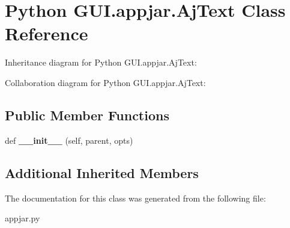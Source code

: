\hypertarget{class_python_01_g_u_i_1_1appjar_1_1_aj_text}{}\section{Python G\+U\+I.\+appjar.\+Aj\+Text Class Reference}
\label{class_python_01_g_u_i_1_1appjar_1_1_aj_text}


Inheritance diagram for Python G\+U\+I.\+appjar.\+Aj\+Text\+:


Collaboration diagram for Python G\+U\+I.\+appjar.\+Aj\+Text\+:
\subsection*{Public Member Functions}
\begin{DoxyCompactItemize}
\item 
\mbox{\label{class_python_01_g_u_i_1_1appjar_1_1_aj_text_a26e980da7c2c3065c31c317fef844e4a}} 
def {\bfseries \+\_\+\+\_\+init\+\_\+\+\_\+} (self, parent, opts)
\end{DoxyCompactItemize}
\subsection*{Additional Inherited Members}


The documentation for this class was generated from the following file\+:\begin{DoxyCompactItemize}
\item 
appjar.\+py\end{DoxyCompactItemize}
